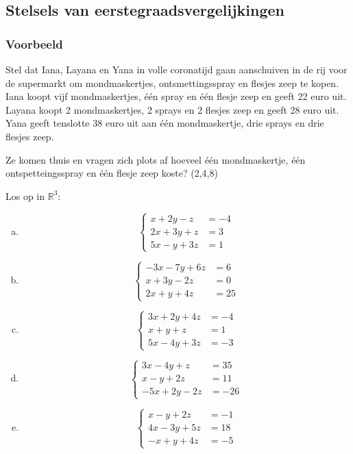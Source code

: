 \documentclass[12pt,twoside]{article}
\begin{document}
\subsection{Stelsels van eerstegraadsvergelijkingen}

\subsubsection{Voorbeeld}

Stel dat Iana, Layana en Yana in volle coronatijd gaan aanschuiven in de rij voor de supermarkt om mondmaskertjes, ontsmettingsspray en flesjes zeep te kopen. Iana koopt vijf mondmaskertjes, één spray en één flesje zeep en geeft 22 euro uit. Layana koopt 2 mondmaskertjes, 2 sprays en 2 flesjes zeep en geeft 28 euro uit. Yana geeft tenslotte 38 euro uit aan één mondmaskertje, drie sprays en drie flesjes zeep.

Ze komen thuis en vragen zich plots af hoeveel één mondmaskertje, één ontspetteingsspray en één flesje zeep koste? (2,4,8)

\begin{oefening}
Los op in $\mathbb{R}^3$:
\begin{multicols}{2}
\begin{enumerate}[(a)]
  \item$$\left\{
\begin{aligned}
  x + 2y -z &= -4\\
  2x+3y+z   &= 3\\
  5x-y+3z   &= 1
\end{aligned}\right.$$
  \item$$\left\{
\begin{aligned}
  -3x -7y +6z &= 6\\
  x+3y-2z   &= 0\\
  2x+y+4z   &= 25
\end{aligned}\right.$$
  \item$$\left\{
\begin{aligned}
  3x +2y +4z &= -4\\
  x+y+z   &= 1\\
  5x-4y+3z   &= -3
\end{aligned}\right.$$
  \item$$\left\{
\begin{aligned}
  3x -4y +z &= 35\\
  x-y+2z   &= 11\\
  -5x+2y-2z   &= -26
\end{aligned}\right.$$
  \item$$\left\{
\begin{aligned}
  x -y + 2z &= -1\\
  4x-3y+5z   &= 18\\
  -x+y+4z   &= -5
\end{aligned}\right.$$
\end{enumerate}
\end{multicols}
\end{oefening}
\end{document}
